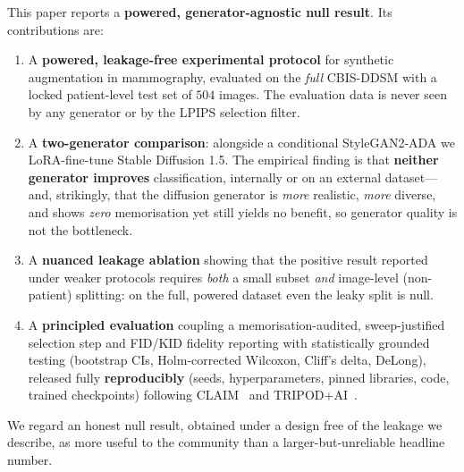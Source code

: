 \documentclass[runningheads]{llncs}
\begin{document}
This paper reports a \textbf{powered, generator-agnostic null result}. Its
contributions are:
\begin{enumerate}
  \item A \textbf{powered, leakage-free experimental protocol} for synthetic
  augmentation in mammography, evaluated on the \emph{full} CBIS-DDSM with a
  locked patient-level test set of $504$ images. The evaluation data is never
  seen by any generator or by the LPIPS selection filter.
  \item A \textbf{two-generator comparison}: alongside a conditional
  StyleGAN2-ADA we LoRA-fine-tune Stable Diffusion 1.5. The empirical finding is
  that \textbf{neither generator improves} classification, internally or on an
  external dataset---and, strikingly, that the diffusion generator is
  \emph{more} realistic, \emph{more} diverse, and shows \emph{zero} memorisation
  yet still yields no benefit, so generator quality is not the bottleneck.
  \item A \textbf{nuanced leakage ablation} showing that the positive result
  reported under weaker protocols requires \emph{both} a small subset \emph{and}
  image-level (non-patient) splitting: on the full, powered dataset even the
  leaky split is null.
  \item A \textbf{principled evaluation} coupling a memorisation-audited,
  sweep-justified selection step and FID/KID fidelity reporting with
  statistically grounded testing (bootstrap CIs, Holm-corrected Wilcoxon, Cliff's
  delta, DeLong), released fully \textbf{reproducibly} (seeds, hyperparameters,
  pinned libraries, code, trained checkpoints) following
  CLAIM~\cite{mongan2020claim} and TRIPOD+AI~\cite{collins2024tripodai}.
\end{enumerate}
We regard an honest null result, obtained under a design free of the leakage we
describe, as more useful to the community than a larger-but-unreliable headline
number.

\end{document}
